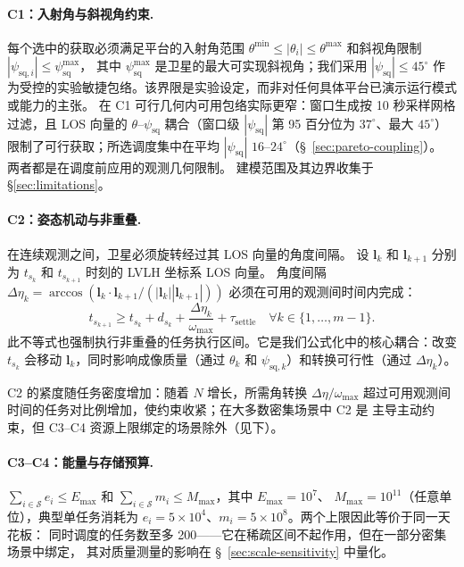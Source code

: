 \documentclass[preprint,12pt,authoryear]{elsarticle}
\begin{document}
\paragraph{C1：入射角与斜视角约束.}
每个选中的获取必须满足平台的入射角范围 $\theta^{\min} \leq |\theta_i| \leq \theta^{\max}$
和斜视角限制 $|\psi_{\text{sq},i}| \leq \psi_{\text{sq}}^{\max}$，
其中 $\psi_{\text{sq}}^{\max}$ 是卫星的最大可实现斜视角；我们采用 $|\psi_{\text{sq}}| \leq 45^\circ$
作为受控的实验敏捷包络。该界限是实验设定，而非对任何具体平台已演示运行模式或能力的主张。
在 C1 可行几何内可用包络实际更窄：窗口生成按 10 秒采样网格过滤，且 LOS 向量的
$\theta$--$\psi_{\text{sq}}$ 耦合（窗口级 $|\psi_{\text{sq}}|$ 第 95 百分位为 $37^\circ$、最大 $45^\circ$）
限制了可行获取；所选调度集中在平均 $|\psi_{\text{sq}}|$ $16$--$24^\circ$（\S~\ref{sec:pareto-coupling}）。
两者都是在调度前应用的观测几何限制。
建模范围及其边界收集于 \S\ref{sec:limitations}。

\paragraph{C2：姿态机动与非重叠.}
在连续观测之间，卫星必须旋转经过其 LOS 向量的角度间隔。
设 $\mathbf{l}_k$ 和 $\mathbf{l}_{k+1}$ 分别为 $t_{s_k}$ 和 $t_{s_{k+1}}$ 时刻的 LVLH 坐标系 LOS 向量。
角度间隔 $\Delta\eta_k = \arccos(\mathbf{l}_k\cdot\mathbf{l}_{k+1}/(|\mathbf{l}_k||\mathbf{l}_{k+1}|))$
必须在可用的观测间时间内完成：
\begin{equation}
t_{s_{k+1}} \geq t_{s_k} + d_{s_k} + \frac{\Delta\eta_k}{\omega_{\max}} + \tau_{\text{settle}} \quad \forall k \in \{1,\ldots,m-1\}.
\label{eq:c2}
\end{equation}
此不等式也强制执行非重叠的任务执行区间。它是我们公式化中的核心耦合：改变 $t_{s_k}$ 会移动
$\mathbf{l}_k$，同时影响成像质量（通过 $\theta_k$ 和 $\psi_{\text{sq},k}$）和转换可行性（通过 $\Delta\eta_k$）。

C2 的紧度随任务密度增加：随着 $N$ 增长，所需角转换 $\Delta\eta / \omega_{\max}$
超过可用观测间时间的任务对比例增加，使约束收紧；在大多数密集场景中 C2 是
主导主动约束，但 C3--C4 资源上限绑定的场景除外（见下）。

\paragraph{C3--C4：能量与存储预算.}
$\sum_{i \in \mathcal{S}} e_i \leq E_{\max}$ 和
$\sum_{i \in \mathcal{S}} m_i \leq M_{\max}$，其中 $E_{\max}=10^7$、
$M_{\max}=10^{11}$（任意单位），典型单任务消耗为
$e_i = 5\times10^4$、$m_i = 5\times10^8$。两个上限因此等价于同一天花板：
同时调度的任务数至多 200——它在稀疏区间不起作用，但在一部分密集场景中绑定，
其对质量测量的影响在 \S~\ref{sec:scale-sensitivity} 中量化。
\end{document}

